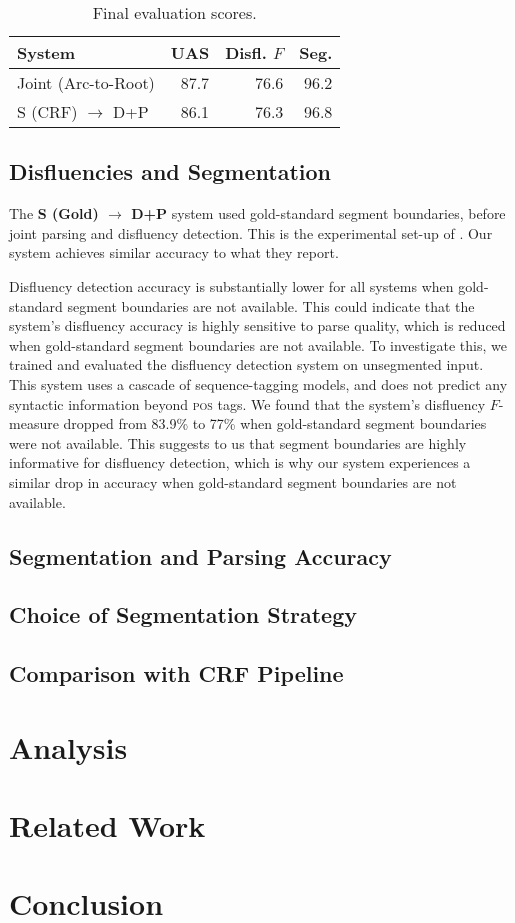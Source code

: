 \documentclass[11pt,letterpaper]{article}
\begin{document}
\begin{table}
    \centering
    \small
    \begin{tabular}{l|rrr}
        System & UAS & Disfl. $F$ & Seg. \\
        \hline \hline
        Joint (Arc-to-Root) & 87.7 & 76.6 & 96.2 \\
        S (CRF) $\rightarrow$ D+P & 86.1 & 76.3 & 96.8 \\
        \hline
    \end{tabular}
    \caption{\small Final evaluation scores.}
    \vspace*{-4em}
\end{table}

\subsection{Disfluencies and Segmentation}

The \textbf{S (Gold) $\rightarrow$ D+P} system used gold-standard segment boundaries,
before joint parsing and disfluency detection.  This is the experimental
set-up of \citet{honnibal:14}.  Our system achieves similar
accuracy to what they report.

Disfluency detection accuracy is substantially lower for all systems when
gold-standard segment boundaries are not available.  This could indicate that
the system's disfluency accuracy is highly sensitive to parse quality, which
is reduced when gold-standard segment boundaries are not available.
To investigate this, we trained and evaluated the \citet{qian:13} disfluency
detection system on unsegmented input.  This system uses a cascade of
sequence-tagging models, and does not predict any syntactic information beyond
\textsc{pos} tags.
We found that the \citeauthor{qian:13} system's disfluency $F$-measure dropped
from 83.9\% to 77\% when gold-standard segment boundaries were not available.
This suggests to us that segment boundaries are highly informative
for disfluency detection, which is why our system experiences a similar drop
in accuracy when gold-standard segment boundaries are not available.

\subsection{Segmentation and Parsing Accuracy}

\subsection{Choice of Segmentation Strategy}

\subsection{Comparison with CRF Pipeline}

\section{Analysis}


\section{Related Work}

\section{Conclusion}




\end{document}
